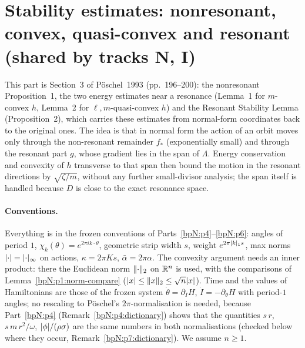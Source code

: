 \section{Stability estimates: nonresonant, convex, quasi-convex and resonant (shared by tracks N, I)}\label{bpN:p7}
\providecommand{\wn}[3]{\lvert #1\rvert_{#2,#3}}
\providecommand{\Dom}[2]{\mathcal D_{#1,#2}}
\providecommand{\Os}[2]{\mathcal O(#1,#2)}
\providecommand{\ip}[2]{\langle #1,#2\rangle}
\providecommand{\UD}[1]{U_{#1}D}
\begingroup\sloppy

This part is Section~3 of P\"oschel~1993 (pp.~196--200): the nonresonant Proposition~1, the two energy estimates near a resonance (Lemma~1 for $m$-convex $h$, Lemma~2 for $\ell,m$-quasi-convex $h$) and the Resonant Stability Lemma (Proposition~2), which carries these estimates from normal-form coordinates back to the original ones.
The idea is that in normal form the action of an orbit moves only through the non-resonant remainder $f_*$ (exponentially small) and through the resonant part $g$, whose gradient lies in the span of $\Lambda$. Energy conservation and convexity of $h$ transverse to that span then bound the motion in the resonant directions by $\sqrt{\zeta/m}$, without any further small-divisor analysis; the span itself is handled because $D$ is close to the exact resonance space.

\paragraph{Conventions.} Everything is in the frozen conventions of Parts~\ref{bpN:p4}--\ref{bpN:p6}: angles of period $1$, $\chi_k(\theta)=e^{2\pi ik\cdot\theta}$, geometric strip width $s$, weight $e^{2\pi\lvert k\rvert_1s}$, max norms $\lvert \cdot\rvert=\lvert \cdot\rvert_\infty$ on actions, $\kappa=2\pi Ks$, $\bar\alpha=2\pi\alpha$.
The convexity argument needs an inner product: there the Euclidean norm $\lVert \cdot\rVert_2$ on $\mathbb{R}^n$ is used, with the comparisons of Lemma~\ref{bpN:p1:norm-compare} ($\lvert x\rvert\le\lVert x\rVert_2\le\sqrt n\lvert x\rvert$). Time and the values of Hamiltonians are those of the frozen system $\dot\theta=\partial_IH$, $\dot I=-\partial_\theta H$ with period-$1$ angles; no rescaling to P\"oschel's $2\pi$-normalisation is needed, because Part~\ref{bpN:p4} (Remark~\ref{bpN:p4:dictionary}) shows that the quantities $s\,r$, $s\,m\,r^2/\omega$, $\lvert \phi\rvert/(\rho\sigma)$ are the same numbers in both normalisations (checked below where they occur, Remark~\ref{bpN:p7:dictionary}). We assume $n\ge1$.

